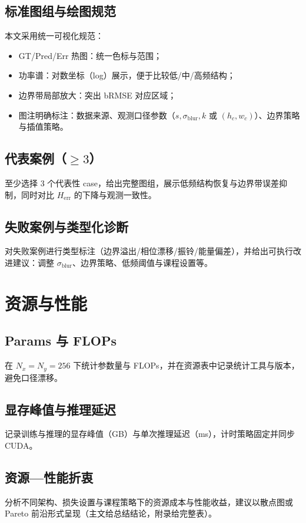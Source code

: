 \subsection{标准图组与绘图规范}\label{sec:vis_standard}

本文采用统一可视化规范：
\begin{itemize}
  \item GT/Pred/Err 热图：统一色标与范围；
  \item 功率谱：对数坐标（log）展示，便于比较低/中/高频结构；
  \item 边界带局部放大：突出 bRMSE 对应区域；
  \item 图注明确标注：数据来源、观测口径参数（$s,\sigma_{\text{blur}},k$ 或 $(h_c,w_c)$）、边界策略与插值策略。
\end{itemize}

\subsection{代表案例（\texorpdfstring{$\ge 3$}{>=3}）}\label{sec:vis_representative}
至少选择 3 个代表性 case，给出完整图组，展示低频结构恢复与边界带误差抑制，同时对比 $H_{\mathrm{err}}$ 的下降与观测一致性。

\subsection{失败案例与类型化诊断}\label{sec:vis_failure}
对失败案例进行类型标注（边界溢出/相位漂移/振铃/能量偏差），并给出可执行改进建议：调整 $\sigma_{\text{blur}}$、边界策略、低频阈值与课程设置等。

\section{资源与性能}\label{sec:resource_perf}

\subsection{Params 与 FLOPs}\label{sec:params_flops_ch6}
在 $N_x=N_y=256$ 下统计参数量与 FLOPs，并在资源表中记录统计工具与版本，避免口径漂移。

\subsection{显存峰值与推理延迟}\label{sec:mem_latency_ch6}
记录训练与推理的显存峰值（GB）与单次推理延迟（ms），计时策略固定并同步 CUDA。

\subsection{资源—性能折衷}\label{sec:tradeoff}
分析不同架构、损失设置与课程策略下的资源成本与性能收益，建议以散点图或 Pareto 前沿形式呈现（主文给总结结论，附录给完整表）。

